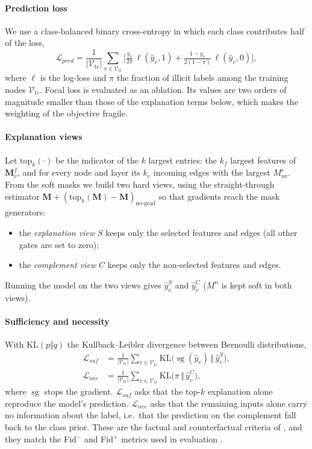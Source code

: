 \paragraph{Prediction loss} We use a class-balanced binary cross-entropy in which each class contributes half of the loss,
\begin{equation}
\mathcal{L}_{pred}=\frac{1}{|\mathcal{V}_{tr}|}\sum_{v\in\mathcal{V}_{tr}}\Big[\tfrac{y_v}{2\pi}\,\ell(\hat y_v,1)+\tfrac{1-y_v}{2(1-\pi)}\,\ell(\hat y_v,0)\Big],
\label{eq:pred_loss}
\end{equation}
where $\ell$ is the log-loss and $\pi$ the fraction of illicit labels among the training nodes $\mathcal{V}_{tr}$. Focal loss \citep{lin2017focal} is evaluated as an ablation. Its values are two orders of magnitude smaller than those of the explanation terms below, which makes the weighting of the objective fragile.

\paragraph{Explanation views} Let $\mathrm{top}_k(\cdot)$ be the indicator of the $k$ largest entries: the $k_f$ largest features of $\mathbf{M}^f_v$, and for every node and layer its $k_e$ incoming edges with the largest $M^e_{uv}$. From the soft masks we build two hard views, using the straight-through estimator $\mathbf{M}+(\mathrm{top}_k(\mathbf{M})-\mathbf{M})_{\text{no-grad}}$ so that gradients reach the mask generators:
\begin{itemize}
\item the \emph{explanation view} $S$ keeps only the selected features and edges (all other gates are set to zero);
\item the \emph{complement view} $C$ keeps only the non-selected features and edges.
\end{itemize}
Running the model on the two views gives $\hat y^{S}_v$ and $\hat y^{C}_v$ ($M^n$ is kept soft in both views).

\paragraph{Sufficiency and necessity} With $\mathrm{KL}(p\Vert q)$ the Kullback--Leibler divergence between Bernoulli distributions,
\begin{align}
\mathcal{L}_{suf}&=\frac{1}{|\mathcal{V}_{tr}|}\sum_{v\in\mathcal{V}_{tr}}\mathrm{KL}\big(\operatorname{sg}(\hat y_v)\,\Vert\,\hat y^{S}_v\big),\label{eq:suf}\\
\mathcal{L}_{nec}&=\frac{1}{|\mathcal{V}_{tr}|}\sum_{v\in\mathcal{V}_{tr}}\mathrm{KL}\big(\pi\,\Vert\,\hat y^{C}_v\big),\label{eq:nec}
\end{align}
where $\operatorname{sg}$ stops the gradient. $\mathcal{L}_{suf}$ asks that the top-$k$ explanation alone reproduce the model's prediction. $\mathcal{L}_{nec}$ asks that the remaining inputs alone carry no information about the label, i.e.\ that the prediction on the complement fall back to the class prior. These are the factual and counterfactual criteria of \citet{tan2022counterfactual}, and they match the Fid$^-$ and Fid$^+$ metrics used in evaluation \citep{yuan2021subgraphx,amara2022graphframex}.

